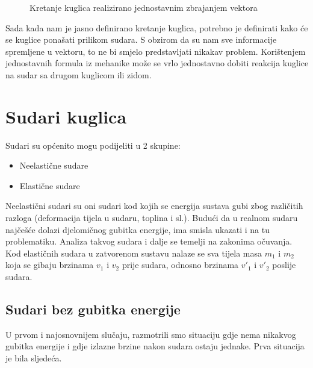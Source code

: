 \begin{figure}[!http]
	\begin{center}
	\end{center}
	\caption {Kretanje kuglica realizirano jednostavnim zbrajanjem vektora}
	\label{fig:14}
\end{figure}

Sada kada nam je jasno definirano kretanje kuglica, potrebno je definirati kako će se kuglice ponašati prilikom sudara. S obzirom da su nam sve informacije spremljene u vektoru, to ne bi smjelo predstavljati nikakav problem. Korištenjem jednostavnih formula iz mehanike može se vrlo jednostavno dobiti reakcija kuglice na sudar sa drugom kuglicom ili zidom.

\section{Sudari kuglica}

Sudari su općenito mogu podijeliti u 2 skupine:
\begin{itemize}
	\item Neelastične sudare
	\item Elastične sudare
\end{itemize}
Neelastični sudari su oni sudari kod kojih se energija sustava gubi zbog različitih razloga (deformacija tijela u sudaru, toplina i sl.). Budući da u realnom sudaru najčešće dolazi djelomičnog gubitka energije, ima smisla ukazati i na tu problematiku\cite{9}. Analiza takvog sudara i dalje se temelji na zakonima očuvanja. Kod elastičnih sudara u zatvorenom sustavu nalaze se sva tijela masa $m_{1}$ i $m_{2}$ koja se gibaju brzinama $v_{1}$ i $v_{2}$ prije sudara, odnosno brzinama $v'_{1}$ i $v'_{2}$ poslije sudara\cite{9}.
\subsection{Sudari bez gubitka energije} \label{subsec:no_energy}
U prvom i najosnovnijem slučaju, razmotrili smo situaciju gdje nema nikakvog gubitka energije i gdje izlazne brzine nakon sudara ostaju jednake. Prva situacija je bila sljedeća.

